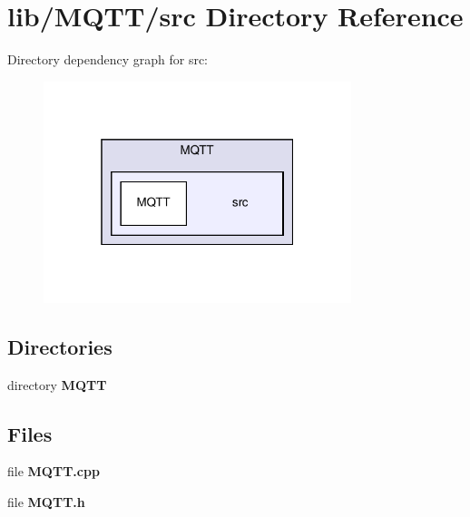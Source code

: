 \section{lib/\+M\+Q\+T\+T/src Directory Reference}
\label{dir_1508bbc8e3a42d98afccad59f8876ca6}
Directory dependency graph for src\+:\nopagebreak
\begin{figure}[H]
\begin{center}
\leavevmode
\includegraphics[width=254pt]{dir_1508bbc8e3a42d98afccad59f8876ca6_dep}
\end{center}
\end{figure}
\subsection*{Directories}
\begin{DoxyCompactItemize}
\item 
directory \textbf{ M\+Q\+TT}
\end{DoxyCompactItemize}
\subsection*{Files}
\begin{DoxyCompactItemize}
\item 
file \textbf{ M\+Q\+T\+T.\+cpp}
\item 
file \textbf{ M\+Q\+T\+T.\+h}
\end{DoxyCompactItemize}
